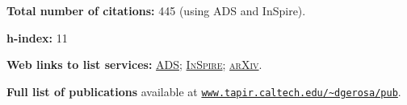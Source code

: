 \documentclass[11pt,letterpaper,sans]{moderncv}
\begin{document}
\textbf{Total number of citations:} 445 (using ADS and InSpire).

\textbf{h-index:} 11


\textbf{Web links to list services:}
\href{http://labs.adsabs.harvard.edu/adsabs/search/?q=author%3A%22Gerosa%2C+Davide%22&month_from=&year_from=&month_to=&year_to=&db_f=&nr=&article=1&bigquery=&re_sort_type=CITED&re_sort_dir=desc}{\textsc{ADS}}; 
\href{http://inspirehep.net/search?ln=en&ln=en&p=exactauthor%3AD.Gerosa.1&of=hb&action_search=Search&sf=&so=d&rm=citation&rg=25&sc=0}{\textsc{InSpire}}; 
\href{http://arxiv.org/a/gerosa_d_1.html}{\textsc{arXiv}}.

\textbf{Full list of publications} available at \href{http://www.tapir.caltech.edu/~dgerosa/pub}{\texttt{www.tapir.caltech.edu/\textasciitilde dgerosa/pub}}.






\vspace{+0.2cm}
\cvitem{\textcolor{color1}{Selected publications}}{}
\vspace{-0.7cm}
\end{document}
